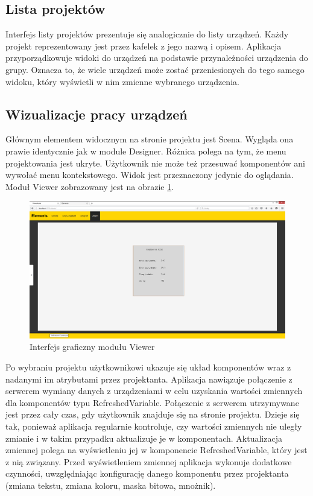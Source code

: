 \subsection{Lista projektów}
Interfejs listy projektów prezentuje się analogicznie do listy urządzeń. Każdy projekt reprezentowany jest przez kafelek z jego nazwą i opisem. Aplikacja przyporządkowuje widoki do urządzeń na podstawie przynależności urządzenia do grupy. Oznacza to, że wiele urządzeń może zostać przeniesionych do tego samego widoku, który wyświetli w nim zmienne wybranego urządzenia.

\subsection{Wizualizacje pracy urządzeń}
Głównym elementem widocznym na stronie projektu jest Scena. Wygląda ona prawie identycznie jak w module Designer. Różnica polega na tym, że menu projektowania jest ukryte. Użytkownik nie może też przesuwać komponentów ani wywołać menu kontekstowego. Widok jest przeznaczony jedynie do oglądania. Moduł Viewer zobrazowany jest na obrazie \ref{fig:viewer_project}.

\begin{figure}[h]
\centerline{
	\includegraphics[width=180mm]{./img/screen/viewer_projekt.png}
}
	\caption{Interfejs graficzny modułu Viewer}
	\label{fig:viewer_project}
\end{figure}
	
Po wybraniu projektu użytkownikowi ukazuje się układ komponentów wraz z nadanymi im atrybutami przez projektanta. Aplikacja nawiązuje połączenie z serwerem wymiany danych z urządzeniami w celu uzyskania wartości zmiennych dla komponentów typu RefreshedVariable. Połączenie z serwerem utrzymywane jest przez cały czas, gdy użytkownik znajduje się na stronie projektu. Dzieje się tak, ponieważ aplikacja regularnie kontroluje, czy wartości zmiennych nie uległy zmianie i w takim przypadku aktualizuje je w komponentach. Aktualizacja zmiennej polega na wyświetleniu jej w komponencie RefreshedVariable, który jest z nią związany. Przed wyświetleniem zmiennej aplikacja wykonuje dodatkowe czynności, uwzględniając konfigurację danego komponentu przez projektanta (zmiana tekstu, zmiana koloru, maska bitowa, mnożnik).

